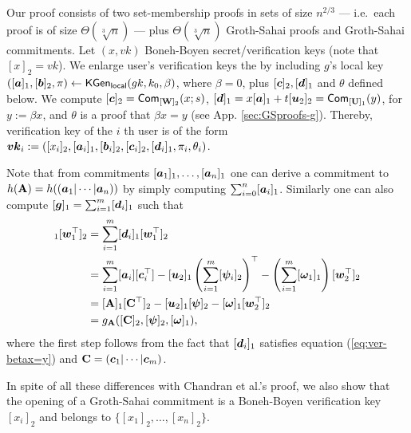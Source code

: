 Our proof consists of two set-membership proofs in sets of size $n^{2/3}$ --- i.e.~each proof is of size $\Theta(\sqrt[3]{n})$ ---  plus $\Theta(\sqrt[3]{n})$ Groth-Sahai proofs and Groth-Sahai commitments.
Let $(x,vk)$ Boneh-Boyen secret/verification keys (note that $[x]_2=vk$).
We enlarge user's verification keys the by including $g$'s local key $([{\boldsymbol{a}}]_1,[{\boldsymbol{b}}]_2, \pi)\gets \mathsf{KGen}_{\mathsf{local}}(gk,k_0,\beta)$, where $\beta=0$, plus $[{\boldsymbol{c}}]_2,[{\boldsymbol{d}}]_1$ and $\theta$ defined below. 
We compute $[{\boldsymbol{c}}]_2=\mathsf{Com}_{[\mathbf{{W}}]_2}(x;s)$, $[{\boldsymbol{d}}]_1 = x[{\boldsymbol{a}}]_1+t[{\boldsymbol{u}}_2]_2=\mathsf{Com}_{[\mathbf{{U}}]_1}(y)$, for $y:=\beta x$, and $\theta$ is a proof that $\beta x = y$ (see App. \ref{sec:GSproofs-g}). Thereby, verification key of the $i$ th user is of the form ${\boldsymbol{vk}}_i:=([x_i]_2,[{\boldsymbol{a}}_i]_1,[{\boldsymbol{b}}_i]_2,[{\boldsymbol{c}}_i]_2,[{\boldsymbol{d}}_i]_1,\pi_i,\theta_i)$.

Note that from commitments $[{\boldsymbol{a}}_1]_1,\ldots,[{\boldsymbol{a}}_n]_1$ one can derive a commitment to $h(\mathbf{{A}})=h(({\boldsymbol{a}}_1|\cdots|{\boldsymbol{a}}_n))$ by simply computing $\sum_{i=0}^n [{\boldsymbol{a}}_i]_1$. Similarly one can also compute $[{\boldsymbol{g}}]_1 = \sum_{i=1}^m[{\boldsymbol{d}}_i]_1$ such that
\begin{align*}
[\vecb{g}]_1[\vecb{w}_1^\top]_2 &= \sum_{i=1}^m [\vecb{d}_i]_1[\vecb{w}_1^\top]_2\\
&= \sum_{i=1}^m [\vecb{a}_i][\vecb{c}_i^\top] - [\vecb{u}_2]_1\left(\sum_{i=1}^m[\vecb{\psi}_i]_2\right)^\top  -\left(\sum_{i=1}^m[\vecb{\omega}_1]_1\right)[\vecb{w}_2^\top]_2\\
&= [\matr{A}]_1[\matr{C}^\top]_2 - [\vecb{u}_2]_1[\vecb{\psi}]_2 - [\vecb{\omega}]_1[\vecb{w}_2^\top]_2\\
&= g_{\matr{A}}([\matr{C}]_2,[\vecb{\psi}]_2,[\vecb{\omega}]_1),
\end{align*}
where the first step follows from the fact that $[{\boldsymbol{d}}_i]_1$ satisfies equation (\ref{eq:ver-betax=y}) and $\mathbf{{C}}=({\boldsymbol{c}}_1|\cdots|{\boldsymbol{c}}_m)$. %

In spite of all these differences with Chandran et al.'s proof, we also show that the opening of a Groth-Sahai commitment is a Boneh-Boyen verification key $[x_i]_2$ and belongs to $\{[x_1]_2,\ldots,[x_n]_2\}$.

